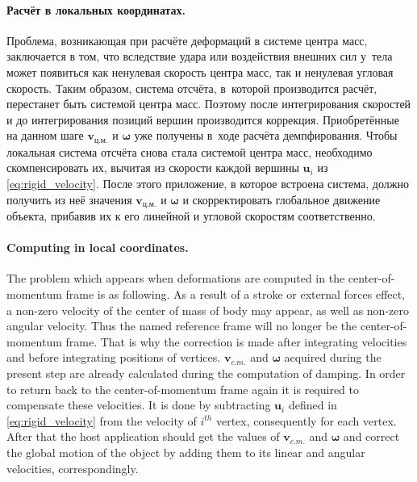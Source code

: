 \documentclass[a4paper, 12pt, titlepage]{extarticle}
\newcommand{\vect}[1]{\mathbf{#1}} %
\begin{document}
\begin{original}
        \paragraph{Расчёт в локальных координатах.} Проблема, возникающая при расчёте деформаций в
        системе центра масс, заключается в том, что вследствие удара или воздействия внешних сил
        у~тела может появиться как ненулевая скорость центра масс, так и ненулевая угловая скорость.
        Таким образом, система отсчёта, в~которой производится расчёт, перестанет быть системой центра
        масс. Поэтому после интегрирования скоростей и до интегрирования позиций вершин производится
        коррекция. Приобретённые на данном шаге $\vect{v}_{ц.м.}$ и $\vect{\omega}$ уже получены
        в~ходе расчёта демпфирования. Чтобы локальная система отсчёта снова стала системой центра масс,
        необходимо скомпенсировать их, вычитая из скорости каждой вершины $\vect{u}_i$ из \eqref{eq:rigid_velocity}.
        После этого приложение, в которое встроена система, должно получить из неё значения
        $\vect{v}_{ц.м.}$ и $\vect{\omega}$ и скорректировать глобальное движение объекта, прибавив их
        к его линейной и угловой скоростям соответственно.
\end{original}

        \paragraph{Computing in local coordinates.} The problem which appears when deformations are
        computed in the center-of-momentum frame is as following. As a result of a stroke or
        external forces effect, a non-zero velocity of the center of mass of body may appear, as well as
        non-zero angular velocity. Thus the named reference frame will no longer be the
        center-of-momentum frame. That is why the correction is made after integrating velocities
        and before integrating positions of vertices. $\vect{v}_{c.m.}$ and $\vect{\omega}$ acquired
        during the present step are already calculated during the computation of damping. In order to
        return back to the center-of-momentum frame again it is required to compensate these
        velocities. It is done by subtracting $\vect{u}_i$ defined in \eqref{eq:rigid_velocity} from
        the velocity of $i^{th}$ vertex, consequently for each vertex. After that the host
        application should get the values of $\vect{v}_{c.m.}$ and $\vect{\omega}$ and correct the
        global motion of the object by adding them to its linear and angular velocities, correspondingly.
\end{document}
